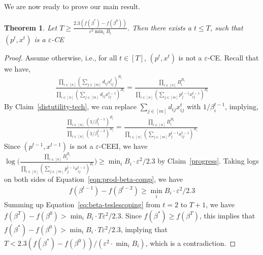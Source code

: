 \documentclass[format=acmsmall,authorversion]{acmart}
\newtheorem{theorem}{Theorem}
\newcommand{\notename}[2]{{\textcolor{blue}{\footnotesize{\bf (#1:} {#2}{\bf ) }}}}
\newcommand{\RM}[1]{{\notename{RM}{#1}}}
\begin{document}
We are now ready to prove our main result.

\begin{theorem}
\label{Theorem-convergence}
    Let $T \geq \frac{2.3(f(\beta^*) - f(\beta^0))}{\varepsilon^2 \min_i B_i }$. Then there exists a $t \leq T$, such that $(p^t,x^t)$ is a $\varepsilon$-CE 
\end{theorem}

\begin{proof}
    Assume otherwise, i.e., for all $t \in [T]$,  $(p^t,x^t)$ is not a $\varepsilon$-CE. Recall that we have,
    \begin{align*}
        \frac{\prod_{i \in [n]} (\sum_{j \in [m]} d_{ij}x^t_{ij})^{B_i}}{\prod_{i \in [n]} (\sum_{j \in [m]} d_{ij}x^{t-1}_{ij})^{B_i}} = \frac{\prod_{i \in [n]} B_i^{B_i} }{\prod_{i \in [n]}(\sum_{j \in [m]}p^{t-1}_j x^{t-1}_{ij})^{B_i}}
    \end{align*}
   By Claim~\ref{distutility-tech}, we can replace  $\sum_{j \in [m]} d_{ij}x^t_{ij}$ with $1/\beta^{t-1}_i$, implying,
   \begin{align}
       \label{eqn:prod-beta-comp}
        \frac{\prod_{i \in [n]} (1/\beta^{t-1}_i)^{B_i}}{\prod_{i \in [n]} (1/\beta^{t-2}_i)^{B_i}} = \frac{\prod_{i \in [n]} B_i^{B_i} }{\prod_{i \in [n]}(\sum_{j \in [m]}p^{t-1}_j x^{t-1}_{ij})^{B_i}}
    \end{align}
   Since $(p^{t-1},x^{t-1})$ is not a $\varepsilon$-CEEI, we have $ \log \bigg( \frac{\prod_{i \in [n]} B_i^{B_i} }{\prod_{i \in [n]}(\sum_{j \in [m]}p^{t-1}_j x^{t-1}_{ij})^{B_i}} \bigg) \geq \min_i B_i \cdot \varepsilon^2/2.3$ by Claim~\ref{progress}. Taking logs on both sides of Equation~\ref{eqn:prod-beta-comp}, we have
   \begin{align}
      \label{eq:beta-teslescoping}
       f(\beta^{t-1}) - f(\beta^{t-2})  \geq  \min_i B_i \cdot \varepsilon^2/2.3
   \end{align}
   Summing up Equation~\ref{eq:beta-teslescoping} from $t=2$ to $T+1$, we have $f(\beta^T) - f(\beta^0) > \min_i B_i \cdot T\varepsilon^2/2.3$. Since $f(\beta^*) \geq f(\beta^T)$, this implies that $f(\beta^*) - f(\beta^0) > \min_i B_i \cdot T\varepsilon^2/2.3$, implying that $T < 2.3(f(\beta^*) - f(\beta^0))/(\varepsilon^2 \cdot \min_i B_i)$, which is a contradiction. 
\end{proof}
\end{document}

